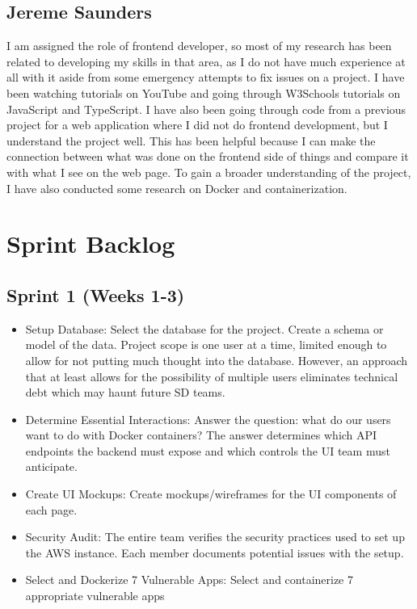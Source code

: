 \documentclass[12pt]{article}
\begin{document}
\subsection{Jereme Saunders}
I am assigned the role of frontend developer, so most of my research has been related to developing my skills in that area, as I do not have much experience at all with it aside from some emergency attempts to fix issues on a project. I have been watching tutorials on YouTube and going through W3Schools tutorials on JavaScript and TypeScript.  I have also been going through code from a previous project for a web application where I did not do frontend development, but I understand the project well. This has been helpful because I can make the connection between what was done on the frontend side of things and compare it with what I see on the web page. To gain a broader understanding of the project, I have also conducted some research on Docker and containerization.

\section{Sprint Backlog}
\subsection{Sprint 1 (Weeks 1-3)}
\begin{itemize}
	\item Setup Database:
	      Select the database for the project. Create a schema or model of the data. Project scope is one user at a time, limited enough to allow for not putting much thought into the database. However, an approach that at least allows for the possibility of multiple users eliminates technical debt which may haunt future SD teams.
	\item Determine Essential Interactions:
	      Answer the question: what do our users want to do with Docker containers? The answer determines which API endpoints the backend must expose and which controls the UI team must anticipate.
	\item Create UI Mockups:
	      Create mockups/wireframes for the UI components of each page.
	\item Security Audit:
	      The entire team verifies the security practices used to set up the AWS instance. Each member documents potential issues with the setup.
	\item Select and Dockerize 7 Vulnerable Apps:
	      Select and containerize 7 appropriate vulnerable apps
\end{itemize}
\end{document}
